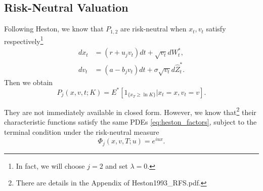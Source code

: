 \documentclass[a4paper,12pt]{article}
\numberwithin{equation}{section}
\theoremstyle{definition}
\theoremstyle{remark}
\begin{document}
\subsection{Risk-Neutral Valuation}\label{sec:heston_Riccati}
Following Heston, we know that $P_{1,2}$ are risk-neutral when 
$x_{t},v_{t}$ satisfy respectively\footnote{In fact, we will 
choose $j=2$ and set $\lambda=0$.}
\begin{equation}
    \label{eq:heston_EMM}
    \begin{split}
        dx_{t}&=(r+u_{j}v_{t})dt+\sqrt{v_{t}}dW^{*}_{t}, \\
        dv_{t}&=(a-b_{j}v_{t})dt+\sigma\sqrt{v_{t}}d\hat{Z}^{*}_{t}.
    \end{split}
\end{equation}
Then we obtain 
\begin{equation}
    P_{j}(x,v,t;K)=E^{*}[1_{\{x_{T}\geq\ln{K}\}}|x_{t}=x,v_{t}=v].
\end{equation}

They are not immediately available in closed form. However, we know 
that\footnote{There are details in the Appendix of Heston1993\_RFS.pdf.} 
their characteristic functions satisfy the same PDEs 
\eqref{eq:heston_factors}, subject to the terminal condition 
under the risk-neutral measure
\begin{equation}
    \Phi_{j}(x,v,T;u)=e^{iux}.
\end{equation}
\end{document}
